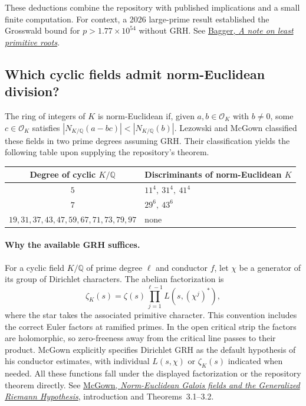 These deductions combine the repository with published implications and a small finite computation. For context, a 2026 large-prime result established the Grosswald bound for $p>1.77\times10^{54}$ without GRH. See \href{https://arxiv.org/abs/2608.20431}{Bagger, \emph{A note on least primitive roots}}.

\subsection{Which cyclic fields admit norm-Euclidean division?}
The ring of integers of $K$ is norm-Euclidean if, given $a,b\in\mathcal O_K$ with $b\ne0$, some $c\in\mathcal O_K$ satisfies $|N_{K/\mathbb Q}(a-bc)|<|N_{K/\mathbb Q}(b)|$. Lezowski and McGown classified these fields in two prime degrees assuming GRH. Their classification yields the following table upon supplying the repository's theorem.
\begin{center}
\begin{tabular}{c|l}
Degree of cyclic $K/\mathbb Q$ & Discriminants of norm-Euclidean $K$\\
\hline
$5$ & $11^4,\ 31^4,\ 41^4$\\
$7$ & $29^6,\ 43^6$\\
$19,31,37,43,47,59,67,71,73,79,97$ & none
\end{tabular}
\end{center}

\paragraph{Why the available GRH suffices.}
For a cyclic field $K/\mathbb Q$ of prime degree $\ell$ and conductor $f$, let $\chi$ be a generator of its group of Dirichlet characters. The abelian factorization is
\[
     \zeta_K(s)=\zeta(s)\prod_{j=1}^{\ell-1} L(s,(\chi^j)^*),
\]
where the star takes the associated primitive character. This convention includes the correct Euler factors at ramified primes. In the open critical strip the factors are holomorphic, so zero-freeness away from the critical line passes to their product. McGown explicitly specifies Dirichlet GRH as the default hypothesis of his conductor estimates, with individual $L(s,\chi)$ or $\zeta_K(s)$ indicated when needed. All these functions fall under the displayed factorization or the repository theorem directly. See \href{https://arxiv.org/abs/1102.2043}{McGown, \emph{Norm-Euclidean Galois fields and the Generalized Riemann Hypothesis}}, introduction and Theorems~3.1--3.2.

